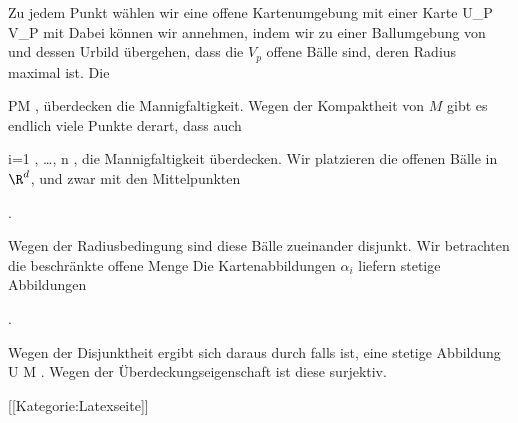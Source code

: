 Zu jedem Punkt
 wählen wir eine offene Kartenumgebung
 mit einer Karte
 {U_P } {V_P
} {}
mit
 Dabei können wir annehmen, indem wir zu einer Ballumgebung von
 und dessen Urbild übergehen, dass die $V_p$ offene Bälle sind, deren Radius maximal
 ist. Die

 {}
 {P\in M} {}
 {} {} {} {,}
überdecken die Mannigfaltigkeit. Wegen der Kompaktheit von $M$ gibt es endlich viele Punkte
 derart, dass auch

 {}
 {i=1 , \ldots , n} {}
 {} {} {} {,}
die Mannigfaltigkeit überdecken. Wir platzieren die offenen Bälle
 in
 {} {}
$\R^d$, und zwar mit den Mittelpunkten

 { . }

Wegen der Radiusbedingung sind diese Bälle zueinander disjunkt. Wir betrachten die beschränkte offene Menge
 Die Kartenabbildungen $\alpha_i$ liefern stetige Abbildungen

 { . }

Wegen der Disjunktheit ergibt sich daraus durch
 falls
 ist, eine stetige Abbildung
\maabbdisp {\varphi} { U } {M
} {.}
Wegen der Überdeckungseigenschaft ist diese surjektiv.

 [[Kategorie:Latexseite]]
